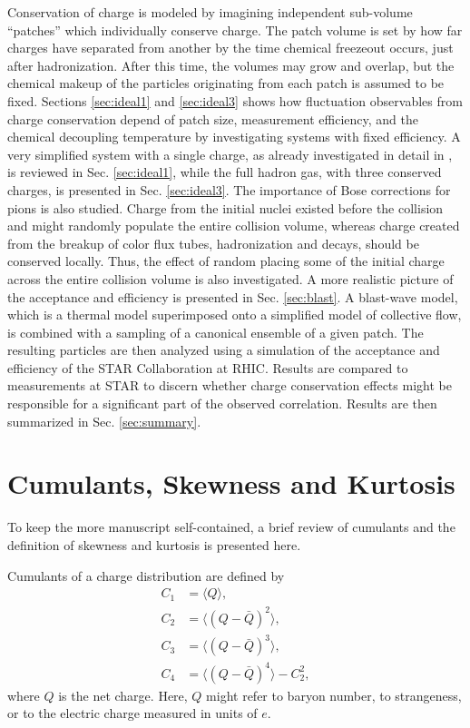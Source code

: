 \documentclass[aps,prc,nofootinbib,showpacs,superscriptaddress,groupedaddress]{revtex4-1}
\begin{document}
Conservation of charge is modeled by imagining independent sub-volume ``patches'' which individually conserve charge. The patch volume is set by how far charges have separated from another by the time chemical freezeout occurs, just after hadronization. After this time, the volumes may grow and overlap, but the chemical makeup of the particles originating from each patch is assumed to be fixed. Sections \ref{sec:ideal1} and \ref{sec:ideal3} shows how fluctuation observables from charge conservation depend of patch size, measurement efficiency, and the chemical decoupling temperature by investigating systems with fixed efficiency. A very simplified system with a single charge, as already investigated in detail in \cite{}, is reviewed in Sec. \ref{sec:ideal1}, while the full hadron gas, with three conserved charges, is presented in Sec. \ref{sec:ideal3}. The importance of Bose corrections for pions is also studied. Charge from the initial nuclei existed before the collision and might randomly populate the entire collision volume, whereas charge created from the breakup of color flux tubes, hadronization and decays, should be conserved locally. Thus, the effect of random placing some of the initial charge across the entire collision volume is also investigated. A more realistic picture of the acceptance and efficiency is presented in Sec. \ref{sec:blast}. A blast-wave model, which is a thermal model superimposed onto a simplified model of collective flow, is combined with a sampling of a canonical ensemble of a given patch. The resulting particles are then analyzed using a simulation of the acceptance and efficiency of the STAR Collaboration at RHIC. Results are compared to measurements at STAR to discern whether charge conservation effects might be responsible for a significant part of the observed correlation. Results are then summarized in Sec. \ref{sec:summary}.

\section{Cumulants, Skewness and Kurtosis}

To keep the more manuscript self-contained, a brief review of cumulants and the definition of skewness and kurtosis is presented here.

Cumulants of a charge distribution are defined by 
\begin{eqnarray}
C_1&=\langle Q\rangle,\\
C_2&=\langle(Q-\bar{Q})^2\rangle,\\
C_3&=\langle(Q-\bar{Q})^3\rangle,\\
C_4&=\langle(Q-\bar{Q})^4\rangle-C_2^2,
\end{eqnarray}
where $Q$ is the net charge. Here, $Q$ might refer to baryon number, to strangeness, or to the electric charge measured in units of $e$.
\end{document}
